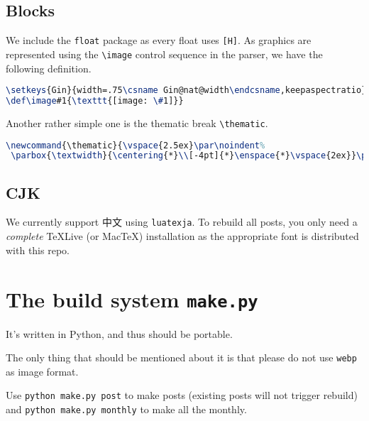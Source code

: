 \section{Blocks}
We include the \verb!float! package as every float uses \verb![H]!. As graphics are represented using the \verb!\image! control sequence in the parser, we have the following definition.\par
\begin{lstlisting}[language=TeX]
\setkeys{Gin}{width=.75\csname Gin@nat@width\endcsname,keepaspectratio}
\def\image#1{\texttt{[image: \#1]}}
\end{lstlisting}
Another rather simple one is the thematic break \verb!\thematic!.\par
\begin{lstlisting}[language=TeX]
\newcommand{\thematic}{\vspace{2.5ex}\par\noindent%
 \parbox{\textwidth}{\centering{*}\\[-4pt]{*}\enspace{*}\vspace{2ex}}\par}
\end{lstlisting}
\section{CJK}
We currently support 中文 using \verb!luatexja!. To rebuild all posts, you only need a \textit{complete} TeXLive (or MacTeX) installation as the appropriate font is distributed with this repo.\par
\chapter{The build system \texttt{make.py}}
It's written in Python, and thus should be portable.\par
The only thing that should be mentioned about it is that please do not use \verb!webp! as image format.\par
Use \verb!python make.py post! to make posts (existing posts will not trigger rebuild) and \verb!python make.py monthly! to make all the monthly.\par
